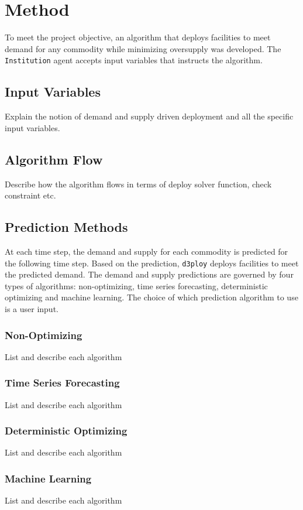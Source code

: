 \documentclass[11pt,letterpaper]{article}
\newcommand{\deploy}{\texttt{d3ploy}\xspace}%
\begin{document}
\section{Method}
To meet the project objective, an algorithm that deploys 
facilities to meet demand for any commodity while 
minimizing oversupply was developed. 
The \texttt{Institution} agent accepts input variables that instructs
the algorithm. 

\subsection{Input Variables}
Explain the notion of demand and supply driven deployment 
and all the specific input variables. 

\subsection{Algorithm Flow}
Describe how the algorithm flows in terms of deploy solver function, 
check constraint etc. 

\subsection{Prediction Methods}
At each time step, the demand and supply for each commodity is 
predicted for the following time step. 
Based on the prediction, \deploy deploys facilities to meet the 
predicted demand. 
The demand and supply predictions are governed by four types
of algorithms: non-optimizing, time series forecasting, 
deterministic optimizing and machine learning. 
The choice of which prediction algorithm to use is a user input. 

\subsubsection{Non-Optimizing}
List and describe each algorithm 

\subsubsection{Time Series Forecasting}
List and describe each algorithm 

\subsubsection{Deterministic Optimizing}
List and describe each algorithm 

\subsubsection{Machine Learning}
List and describe each algorithm 
\end{document}
